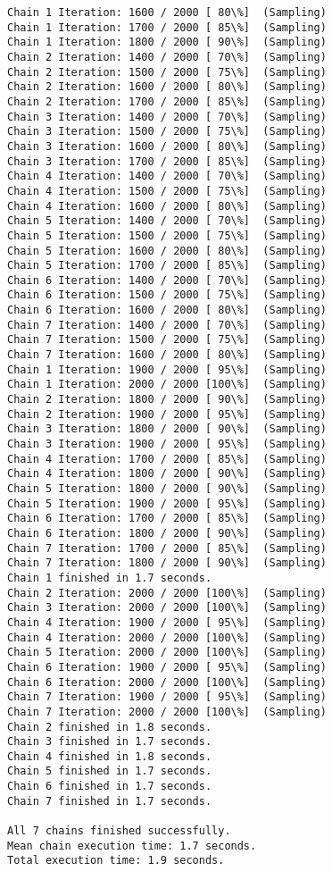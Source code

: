 \documentclass[11pt]{article}
\begin{document}
\begin{Verbatim}[commandchars=\\\{\}]
Chain 1 Iteration: 1600 / 2000 [ 80\%]  (Sampling)
Chain 1 Iteration: 1700 / 2000 [ 85\%]  (Sampling)
Chain 1 Iteration: 1800 / 2000 [ 90\%]  (Sampling)
Chain 2 Iteration: 1400 / 2000 [ 70\%]  (Sampling)
Chain 2 Iteration: 1500 / 2000 [ 75\%]  (Sampling)
Chain 2 Iteration: 1600 / 2000 [ 80\%]  (Sampling)
Chain 2 Iteration: 1700 / 2000 [ 85\%]  (Sampling)
Chain 3 Iteration: 1400 / 2000 [ 70\%]  (Sampling)
Chain 3 Iteration: 1500 / 2000 [ 75\%]  (Sampling)
Chain 3 Iteration: 1600 / 2000 [ 80\%]  (Sampling)
Chain 3 Iteration: 1700 / 2000 [ 85\%]  (Sampling)
Chain 4 Iteration: 1400 / 2000 [ 70\%]  (Sampling)
Chain 4 Iteration: 1500 / 2000 [ 75\%]  (Sampling)
Chain 4 Iteration: 1600 / 2000 [ 80\%]  (Sampling)
Chain 5 Iteration: 1400 / 2000 [ 70\%]  (Sampling)
Chain 5 Iteration: 1500 / 2000 [ 75\%]  (Sampling)
Chain 5 Iteration: 1600 / 2000 [ 80\%]  (Sampling)
Chain 5 Iteration: 1700 / 2000 [ 85\%]  (Sampling)
Chain 6 Iteration: 1400 / 2000 [ 70\%]  (Sampling)
Chain 6 Iteration: 1500 / 2000 [ 75\%]  (Sampling)
Chain 6 Iteration: 1600 / 2000 [ 80\%]  (Sampling)
Chain 7 Iteration: 1400 / 2000 [ 70\%]  (Sampling)
Chain 7 Iteration: 1500 / 2000 [ 75\%]  (Sampling)
Chain 7 Iteration: 1600 / 2000 [ 80\%]  (Sampling)
Chain 1 Iteration: 1900 / 2000 [ 95\%]  (Sampling)
Chain 1 Iteration: 2000 / 2000 [100\%]  (Sampling)
Chain 2 Iteration: 1800 / 2000 [ 90\%]  (Sampling)
Chain 2 Iteration: 1900 / 2000 [ 95\%]  (Sampling)
Chain 3 Iteration: 1800 / 2000 [ 90\%]  (Sampling)
Chain 3 Iteration: 1900 / 2000 [ 95\%]  (Sampling)
Chain 4 Iteration: 1700 / 2000 [ 85\%]  (Sampling)
Chain 4 Iteration: 1800 / 2000 [ 90\%]  (Sampling)
Chain 5 Iteration: 1800 / 2000 [ 90\%]  (Sampling)
Chain 5 Iteration: 1900 / 2000 [ 95\%]  (Sampling)
Chain 6 Iteration: 1700 / 2000 [ 85\%]  (Sampling)
Chain 6 Iteration: 1800 / 2000 [ 90\%]  (Sampling)
Chain 7 Iteration: 1700 / 2000 [ 85\%]  (Sampling)
Chain 7 Iteration: 1800 / 2000 [ 90\%]  (Sampling)
Chain 1 finished in 1.7 seconds.
Chain 2 Iteration: 2000 / 2000 [100\%]  (Sampling)
Chain 3 Iteration: 2000 / 2000 [100\%]  (Sampling)
Chain 4 Iteration: 1900 / 2000 [ 95\%]  (Sampling)
Chain 4 Iteration: 2000 / 2000 [100\%]  (Sampling)
Chain 5 Iteration: 2000 / 2000 [100\%]  (Sampling)
Chain 6 Iteration: 1900 / 2000 [ 95\%]  (Sampling)
Chain 6 Iteration: 2000 / 2000 [100\%]  (Sampling)
Chain 7 Iteration: 1900 / 2000 [ 95\%]  (Sampling)
Chain 7 Iteration: 2000 / 2000 [100\%]  (Sampling)
Chain 2 finished in 1.8 seconds.
Chain 3 finished in 1.7 seconds.
Chain 4 finished in 1.8 seconds.
Chain 5 finished in 1.7 seconds.
Chain 6 finished in 1.7 seconds.
Chain 7 finished in 1.7 seconds.

All 7 chains finished successfully.
Mean chain execution time: 1.7 seconds.
Total execution time: 1.9 seconds.

    \end{Verbatim}
\end{document}
